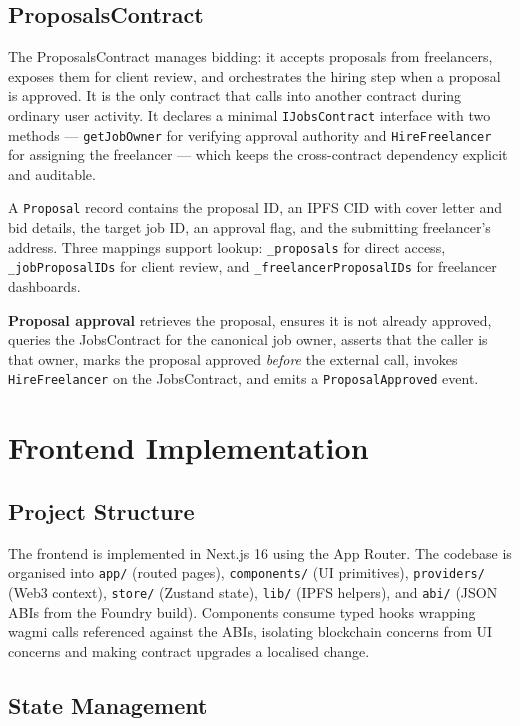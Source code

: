 \subsection{ProposalsContract}

The ProposalsContract manages bidding: it accepts proposals from freelancers, exposes them for client review, and orchestrates the hiring step when a proposal is approved. It is the only contract that calls into another contract during ordinary user activity. It declares a minimal \texttt{IJobsContract} interface with two methods --- \texttt{getJobOwner} for verifying approval authority and \texttt{HireFreelancer} for assigning the freelancer --- which keeps the cross-contract dependency explicit and auditable.

A \texttt{Proposal} record contains the proposal ID, an IPFS CID with cover letter and bid details, the target job ID, an approval flag, and the submitting freelancer's address. Three mappings support lookup: \texttt{\_proposals} for direct access, \texttt{\_jobProposalIDs} for client review, and \texttt{\_freelancerProposalIDs} for freelancer dashboards.

\textbf{Proposal approval} retrieves the proposal, ensures it is not already approved, queries the JobsContract for the canonical job owner, asserts that the caller is that owner, marks the proposal approved \emph{before} the external call, invokes \texttt{HireFreelancer} on the JobsContract, and emits a \texttt{ProposalApproved} event.

\section{Frontend Implementation}

\subsection{Project Structure}

The frontend is implemented in Next.js 16 using the App Router. The codebase is organised into \texttt{app/} (routed pages), \texttt{components/} (UI primitives), \texttt{providers/} (Web3 context), \texttt{store/} (Zustand state), \texttt{lib/} (IPFS helpers), and \texttt{abi/} (JSON ABIs from the Foundry build). Components consume typed hooks wrapping wagmi calls referenced against the ABIs, isolating blockchain concerns from UI concerns and making contract upgrades a localised change.

\subsection{State Management}

